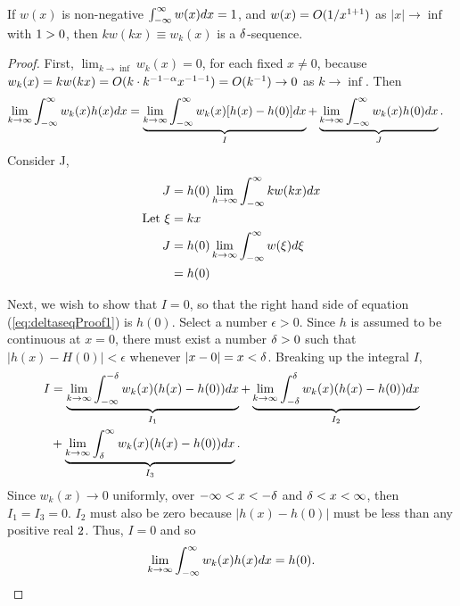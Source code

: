 \begin{theorem}\label{th:assertion}
    If \(w(x)\) is non-negative \(\int_{-\infty}^{\infty} w(x) dx = 1\), and \(w(x)=O(1/x^{1+1})\) as \(|x| \rightarrow \inf\) with \(1>0\), then \(kw(kx) \equiv w_k(x)\) is a \(\delta\)-sequence.
\end{theorem}
\begin{proof}    
    First, \( \lim_{k\rightarrow \inf} w_k(x)=0\), for each fixed \(x \neq 0\), because \(w_k(x)=kw(kx)=O(k\cdot k^{-1-\alpha} x^{-1-1}) = O(k^{-1}) \rightarrow 0\) as \(k \rightarrow \inf\). Then 
    \begin{equation}\label{eq:deltaseqProof1}
        \begin{split}
            \lim_{k\rightarrow \infty}\int_{-\infty}^{\infty} w_k(x)h(x) dx &= \underbrace{\lim_{k\rightarrow\infty} \int_{-\infty}^{\infty} w_k(x)[h(x)-h(0)]dx}_I+ \underbrace{\lim_{k\rightarrow\infty} \int_{-\infty}^{\infty} w_k(x)h(0)dx}_J.
        \end{split}
    \end{equation}
    Consider J,
    \begin{equation}
        \begin{split}
            J &= h(0) \lim_{h\rightarrow\infty} \int_{-\infty}^{\infty} kw(kx)dx\\
            \text{Let  }\xi & =kx\\
            J&=h(0)\lim_{k\rightarrow \infty} \int_{-\infty}^{\infty} w(\xi) d\xi\\
            &= h(0)
        \end{split}
    \end{equation}

    Next, we wish to show that \(I=0\), so that the right hand side of equation (\ref{eq:deltaseqProof1}) is \(h(0)\). Select a number \(\epsilon > 0\). Since \(h\) is assumed to be continuous at \(x=0\), there must exist a number \(\delta>0\) such that \(|h(x)-H(0)|<\epsilon\) whenever \(|x-0|=x<\delta\). Breaking up the integral \(I\),
    \begin{equation}
        \begin{split}
            I &= \underbrace{\lim_{k\rightarrow \infty} \int_{-\infty}^{-\delta} w_k(x)(h(x)-h(0)) dx}_{I_1} + \underbrace{\lim_{k\rightarrow \infty} \int_{-\delta}^{\delta} w_k(x)(h(x)-h(0)) dx}_{I_2} \\ & + \underbrace{\lim_{k\rightarrow \infty} \int_{\delta}^{\infty} w_k(x)(h(x)-h(0)) dx}_{I_3}.\\
        \end{split}
    \end{equation}
    Since \(w_k(x)\rightarrow 0\) uniformly, over \(-\infty< x < -\delta\) and \(\delta < x < \infty \), then \(I_1=I_3 =0\). \(I_2\) must also be zero because \(|h(x)-h(0)|\) must be less than any positive real \(2\). Thus, \(I=0\) and so 
    \begin{equation}
        \lim_{k\rightarrow \infty}\int_{-\infty}^{\infty} w_k(x)h(x) dx = h(0).
    \end{equation}
\end{proof}

